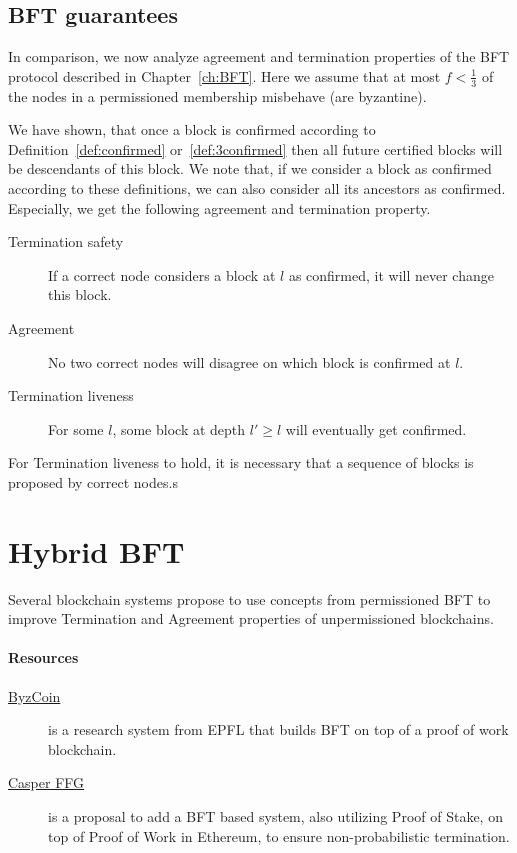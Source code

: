 \subsection{BFT guarantees}
In comparison, we now analyze agreement and termination properties of the BFT protocol described in Chapter~\ref{ch:BFT}. 
Here we assume that at most $f<\frac{1}{3}$ of the nodes in a permissioned membership misbehave (are byzantine).

We have shown, that once a block is confirmed according to Definition~\ref{def:confirmed} or~\ref{def:3confirmed} then all future certified blocks will be descendants of this block. We note that, if we consider a block as confirmed according to these definitions, we can also consider all its ancestors as confirmed. Especially, we get the following agreement and termination property.

\begin{description}
	\item[Termination safety] If a correct node considers a block at \depth $l$ as confirmed, it will never change this block.
	\item[Agreement] No two correct nodes will disagree on which block is confirmed at \depth $l$.
	\item[Termination liveness] For some \depth $l$, some block at depth $l'\geq l$ will eventually get confirmed.
\end{description}

For Termination liveness to hold, it is necessary that a sequence of blocks is proposed by correct nodes.s

\section{Hybrid BFT}
Several blockchain systems propose to use concepts from permissioned BFT to improve Termination and Agreement properties of unpermissioned blockchains. 

\paragraph{Resources}
\begin{description}
	\item[ \href{https://www.usenix.org/conference/usenixsecurity16/technical-sessions/presentation/kogias}{ByzCoin}] is a research system from EPFL that builds BFT on top of a proof of work blockchain.
	\item[\href{https://arxiv.org/pdf/1710.09437.pdf}{Casper FFG}] is a proposal to add a BFT based system, also utilizing Proof of Stake, on top of Proof of Work in Ethereum, to ensure non-probabilistic termination. 
\end{description}

